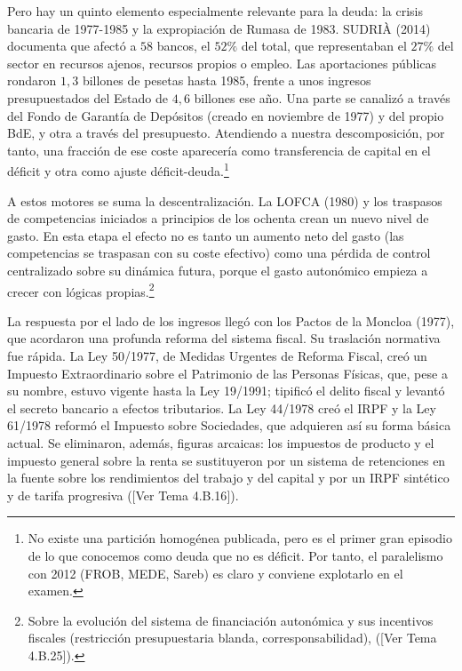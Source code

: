 \documentclass[10pt,a4paper]{article}
\newcommand{\authorfont}[1]{{\fontfamily{EBGaramond-TLF}\selectfont #1}}
\begin{document}
Pero hay un quinto elemento especialmente relevante para la deuda: la crisis bancaria de 1977-1985 y la expropiación de Rumasa de 1983. SUDRIÀ (2014) documenta que afectó a $58$ bancos, el $52\%$ del total, que representaban el $27\%$ del sector en recursos ajenos, recursos propios o empleo. Las aportaciones públicas rondaron $1,3$ billones de pesetas hasta 1985, frente a unos ingresos presupuestados del Estado de $4,6$ billones ese año. Una parte se canalizó a través del Fondo de Garantía de Depósitos (creado en noviembre de 1977) y del propio BdE, y otra a través del presupuesto. Atendiendo a nuestra descomposición, por tanto, una fracción de ese coste aparecería como transferencia de capital en el déficit y otra como ajuste déficit-deuda.\footnote{No existe una partición homogénea publicada, pero es el primer gran episodio de lo que conocemos como deuda que no es déficit. Por tanto, el paralelismo con 2012 (FROB, MEDE, Sareb) es claro y conviene explotarlo en el examen.
} 

A estos motores se suma la descentralización. La LOFCA (1980) y los traspasos de competencias iniciados a principios de los ochenta crean un nuevo nivel de gasto. En esta etapa el efecto no es tanto un aumento neto del gasto (las competencias se traspasan con su coste efectivo) como una pérdida de control centralizado sobre su dinámica futura, porque el gasto autonómico empieza a crecer con lógicas propias.\footnote{Sobre la evolución del sistema de financiación autonómica y sus incentivos fiscales (restricción presupuestaria blanda, corresponsabilidad), ([\authorfont{Ver Tema 4.B.25}]).
}

La respuesta por el lado de los ingresos llegó con los Pactos de la Moncloa (1977), que acordaron una profunda reforma del sistema fiscal. Su traslación normativa fue rápida. La Ley 50/1977, de Medidas Urgentes de Reforma Fiscal, creó un Impuesto Extraordinario sobre el Patrimonio de las Personas Físicas, que, pese a su nombre, estuvo vigente hasta la Ley 19/1991; tipificó el delito fiscal y levantó el secreto bancario a efectos tributarios. La Ley 44/1978 creó el IRPF y la Ley 61/1978 reformó el Impuesto sobre Sociedades, que adquieren así su forma básica actual. Se eliminaron, además, figuras arcaicas: los impuestos de producto y el impuesto general sobre la renta se sustituyeron por un sistema de retenciones en la fuente sobre los rendimientos del trabajo y del capital y por un IRPF sintético y de tarifa progresiva ([\authorfont{Ver Tema 4.B.16}]).
\end{document}
